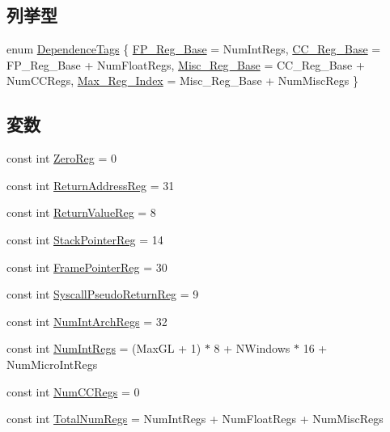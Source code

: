 \subsection*{列挙型}
\begin{DoxyCompactItemize}
\item 
enum \hyperlink{namespaceSparcISA_a4720195f4575f008ac78181d27db827e}{DependenceTags} \{ \hyperlink{namespaceSparcISA_a4720195f4575f008ac78181d27db827ea23c089ac23981fe820094e2fc1579bf4}{FP\_\-Reg\_\-Base} =  NumIntRegs, 
\hyperlink{namespaceSparcISA_a4720195f4575f008ac78181d27db827eae261857dbef59e0d93992a1e2d1fa322}{CC\_\-Reg\_\-Base} =  FP\_\-Reg\_\-Base + NumFloatRegs, 
\hyperlink{namespaceSparcISA_a4720195f4575f008ac78181d27db827ea0cbf9912f8507e55495a158f1b94f803}{Misc\_\-Reg\_\-Base} =  CC\_\-Reg\_\-Base + NumCCRegs, 
\hyperlink{namespaceSparcISA_a4720195f4575f008ac78181d27db827ea0693397933007a82bea39457bd7a7151}{Max\_\-Reg\_\-Index} =  Misc\_\-Reg\_\-Base + NumMiscRegs
 \}
\end{DoxyCompactItemize}
\subsection*{変数}
\begin{DoxyCompactItemize}
\item 
const int \hyperlink{namespaceSparcISA_a33dbba4a12f6733a5ecc2d2b3542b7ee}{ZeroReg} = 0
\item 
const int \hyperlink{namespaceSparcISA_a99ba4a35fbf9debeb1f7ddb1db7b9967}{ReturnAddressReg} = 31
\item 
const int \hyperlink{namespaceSparcISA_a472eedbcba9726645062b921f8d07e98}{ReturnValueReg} = 8
\item 
const int \hyperlink{namespaceSparcISA_a95d0846360ad0e64cb42fda7268a6434}{StackPointerReg} = 14
\item 
const int \hyperlink{namespaceSparcISA_aabd6fa5889c9ccc124dfd4a984046f6f}{FramePointerReg} = 30
\item 
const int \hyperlink{namespaceSparcISA_ab566b6da98edbb32e80291edaf0906ba}{SyscallPseudoReturnReg} = 9
\item 
const int \hyperlink{namespaceSparcISA_a405c0abe85dc0da846c120e3b31f375c}{NumIntArchRegs} = 32
\item 
const int \hyperlink{namespaceSparcISA_a9c412b5118ce369570c156c4e156638a}{NumIntRegs} = (MaxGL + 1) $\ast$ 8 + NWindows $\ast$ 16 + NumMicroIntRegs
\item 
const int \hyperlink{namespaceSparcISA_a717317b863009b3e1b683c3bdddb9fd3}{NumCCRegs} = 0
\item 
const int \hyperlink{namespaceSparcISA_a578a3508d56f10e933ba9559e2cf907c}{TotalNumRegs} = NumIntRegs + NumFloatRegs + NumMiscRegs
\end{DoxyCompactItemize}
